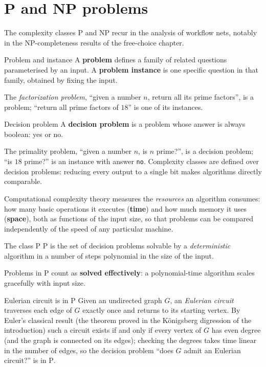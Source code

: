 \section{P and NP problems}

The complexity classes $\mathrm{P}$ and $\mathrm{NP}$ recur in the analysis of workflow nets, notably in the $\mathrm{NP}$-completeness results of the free-choice chapter.
\begin{definitionbox}{Problem and instance}
A \textbf{problem} defines a family of related questions parameterised by an input. A \textbf{problem instance} is one specific question in that family, obtained by fixing the input.
\end{definitionbox}
The \emph{factorization problem}, ``given a number $n$, return all its prime factors'', is a problem; ``return all prime factors of $18$'' is one of its instances.
\begin{definitionbox}{Decision problem}
A \textbf{decision problem} is a problem whose answer is always boolean: yes or no.
\end{definitionbox}
The primality problem, ``given a number $n$, is $n$ prime?'', is a decision problem; ``is $18$ prime?'' is an instance with answer \texttt{no}. Complexity classes are defined over decision problems: reducing every output to a single bit makes algorithms directly comparable.

Computational complexity theory measures the \emph{resources} an algorithm consumes: how many basic operations it executes (\textbf{time}) and how much memory it uses (\textbf{space}), both as functions of the input size, so that problems can be compared independently of the speed of any particular machine.
\begin{definitionbox}{The class $\mathrm{P}$}
$\mathrm{P}$ is the set of decision problems solvable by a \emph{deterministic} algorithm in a number of steps polynomial in the size of the input.
\end{definitionbox}
Problems in $\mathrm{P}$ count as \textbf{solved effectively}: a polynomial-time algorithm scales gracefully with input size.
\begin{examplebox}{Eulerian circuit is in $\mathrm{P}$}
Given an undirected graph $G$, an \emph{Eulerian circuit} traverses each edge of $G$ exactly once and returns to its starting vertex. By Euler's classical result (the theorem proved in the K\"onigsberg digression of the introduction) such a circuit exists if and only if every vertex of $G$ has even degree (and the graph is connected on its edges); checking the degrees takes time linear in the number of edges, so the decision problem ``does $G$ admit an Eulerian circuit?'' is in $\mathrm{P}$.
\end{examplebox}

